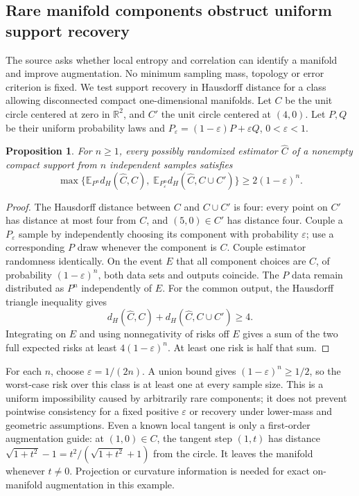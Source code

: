 \documentclass[11pt]{article}
\newtheorem{proposition}{Proposition}
\begin{document}
\subsection{Rare manifold components obstruct uniform support recovery}
The source asks whether local entropy and correlation can identify a manifold and improve augmentation. No minimum sampling mass, topology or error criterion is fixed. We test support recovery in Hausdorff distance for a class allowing disconnected compact one-dimensional manifolds. Let $C$ be the unit circle centered at zero in $\mathbb R^2$, and $C'$ the unit circle centered at $(4,0)$. Let $P,Q$ be their uniform probability laws and $P_\varepsilon=(1-\varepsilon)P+\varepsilon Q$, $0<\varepsilon<1$.
\begin{proposition}
For $n\ge1$, every possibly randomized estimator $\widehat C$ of a nonempty compact support from $n$ independent samples satisfies
\[
\max\{\mathbb E_{P^n}d_H(\widehat C,C),\;
\mathbb E_{P_\varepsilon^n}d_H(\widehat C,C\cup C')\}
\ge2(1-\varepsilon)^n.
\]
\end{proposition}
\begin{proof}
The Hausdorff distance between $C$ and $C\cup C'$ is four: every point on $C'$ has distance at most four from $C$, and $(5,0)\in C'$ has distance four. Couple a $P_\varepsilon$ sample by independently choosing its component with probability $\varepsilon$; use a corresponding $P$ draw whenever the component is $C$. Couple estimator randomness identically. On the event $E$ that all component choices are $C$, of probability $(1-\varepsilon)^n$, both data sets and outputs coincide. The $P$ data remain distributed as $P^n$ independently of $E$. For the common output, the Hausdorff triangle inequality gives
\[
d_H(\widehat C,C)+d_H(\widehat C,C\cup C')\ge4.
\]
Integrating on $E$ and using nonnegativity of risks off $E$ gives a sum of the two full expected risks at least $4(1-\varepsilon)^n$. At least one risk is half that sum.
\end{proof}
For each $n$, choose $\varepsilon=1/(2n)$. A union bound gives $(1-\varepsilon)^n\ge1/2$, so the worst-case risk over this class is at least one at every sample size. This is a uniform impossibility caused by arbitrarily rare components; it does not prevent pointwise consistency for a fixed positive $\varepsilon$ or recovery under lower-mass and geometric assumptions.
Even a known local tangent is only a first-order augmentation guide: at $(1,0)\in C$, the tangent step $(1,t)$ has distance $\sqrt{1+t^2}-1=t^2/(\sqrt{1+t^2}+1)$ from the circle. It leaves the manifold whenever $t\ne0$. Projection or curvature information is needed for exact on-manifold augmentation in this example.
\end{document}

